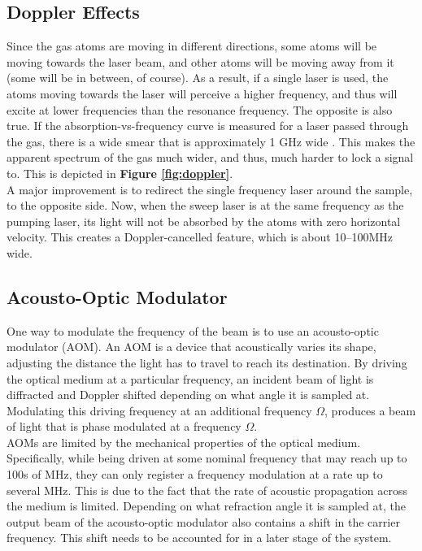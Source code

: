 \subsection{Doppler Effects}

Since the gas atoms are moving in different directions, some atoms will be moving towards the laser beam, and other atoms will be moving away from it (some will be in between, of course).  As a result, if a single laser is used, the atoms moving towards the laser will perceive a higher frequency, and thus will excite at lower frequencies than the resonance frequency.  The opposite is also true.  If the absorption-vs-frequency curve is measured for a laser passed through the gas, there is a wide smear that is approximately 1 GHz wide \cite{madison14}.  This makes the apparent spectrum of the gas much wider, and thus, much harder to lock a signal to. This is depicted in \textbf{Figure \ref{fig:doppler}}. \\

A major improvement is to redirect the single frequency laser around the sample, to the opposite side.  Now, when the sweep laser is at the same frequency as the pumping laser, its light will not be absorbed by the atoms with zero horizontal velocity.  This creates a Doppler-cancelled feature, which is about 10--100MHz wide.

\subsection{Acousto-Optic Modulator}

One way to modulate the frequency of the beam is to use an acousto-optic modulator (AOM). An AOM is a device that acoustically varies its shape, adjusting the distance the light has to travel to reach its destination.  By driving the optical medium at a particular frequency, an incident beam of light is diffracted and Doppler shifted depending on what angle it is sampled at. Modulating this driving frequency at an additional frequency $\Omega$, produces a beam of light that is phase modulated at a frequency $\Omega$. \\

AOMs are limited by the mechanical properties of the optical medium. Specifically, while being driven at some nominal frequency that may reach up to 100s of MHz, they can only register a frequency modulation at a rate up to several MHz. This is due to the fact that the rate of acoustic propagation across the medium is limited. Depending on what refraction angle it is sampled at, the output beam of the acousto-optic modulator also contains a shift in the carrier frequency.  This shift needs to be accounted for in a later stage of the system.

